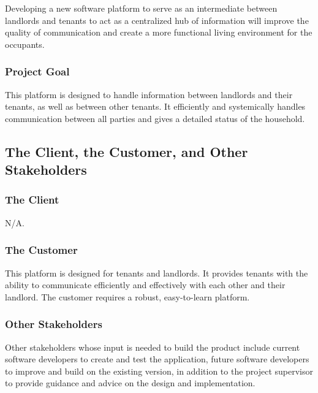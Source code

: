 \documentclass[12pt]{article}
\begin{document}
\noindent Developing a new software platform to serve as an intermediate between 
landlords and tenants to act as a centralized hub of information will improve 
the quality of communication and create a more functional living environment 
for the occupants.

\subsubsection{Project Goal}
This platform is designed to handle information between landlords and their 
tenants, as well as between other tenants. It efficiently and systemically 
handles communication between all parties and gives a detailed status of the household.

\subsection{The Client, the Customer, and Other Stakeholders}
\subsubsection {The Client}
  N/A.
\subsubsection {The Customer}
This platform is designed for tenants and landlords. It provides tenants with the ability to communicate efficiently and effectively with each other and their landlord. The customer requires a robust, easy-to-learn platform.
\subsubsection {Other Stakeholders}
Other stakeholders whose input is needed to build the product include current software developers to create and test the application, future software developers to improve and build on the existing version, in addition to the project supervisor to provide guidance and advice on the design and implementation.
\end{document}
